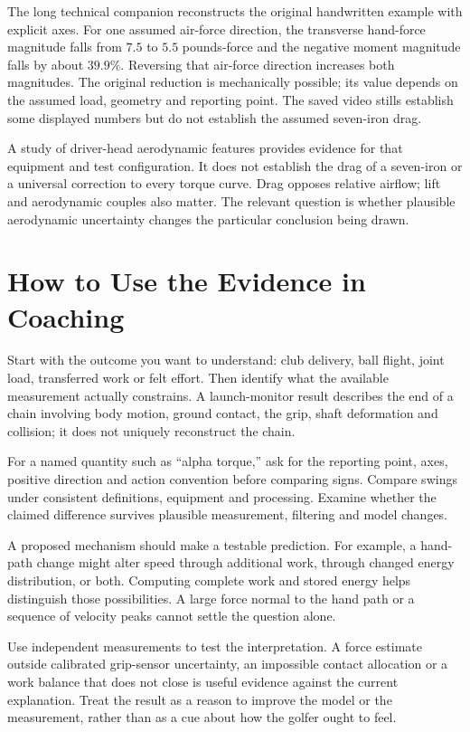 \documentclass[11pt,a4paper]{article}
\begin{document}
The long technical companion reconstructs the original handwritten example with explicit axes. For one assumed air-force direction, the transverse hand-force magnitude falls from $7.5$ to $5.5$ pounds-force and the negative moment magnitude falls by about $39.9\%$. Reversing that air-force direction increases both magnitudes. The original reduction is mechanically possible; its value depends on the assumed load, geometry and reporting point. The saved video stills establish some displayed numbers but do not establish the assumed seven-iron drag.

A study of driver-head aerodynamic features provides evidence for that equipment and test configuration. It does not establish the drag of a seven-iron or a universal correction to every torque curve. Drag opposes relative airflow; lift and aerodynamic couples also matter. The relevant question is whether plausible aerodynamic uncertainty changes the particular conclusion being drawn.

\section{How to Use the Evidence in Coaching}
Start with the outcome you want to understand: club delivery, ball flight, joint load, transferred work or felt effort. Then identify what the available measurement actually constrains. A launch-monitor result describes the end of a chain involving body motion, ground contact, the grip, shaft deformation and collision; it does not uniquely reconstruct the chain.

For a named quantity such as ``alpha torque,'' ask for the reporting point, axes, positive direction and action convention before comparing signs. Compare swings under consistent definitions, equipment and processing. Examine whether the claimed difference survives plausible measurement, filtering and model changes.

A proposed mechanism should make a testable prediction. For example, a hand-path change might alter speed through additional work, through changed energy distribution, or both. Computing complete work and stored energy helps distinguish those possibilities. A large force normal to the hand path or a sequence of velocity peaks cannot settle the question alone.

Use independent measurements to test the interpretation. A force estimate outside calibrated grip-sensor uncertainty, an impossible contact allocation or a work balance that does not close is useful evidence against the current explanation. Treat the result as a reason to improve the model or the measurement, rather than as a cue about how the golfer ought to feel.
\end{document}
